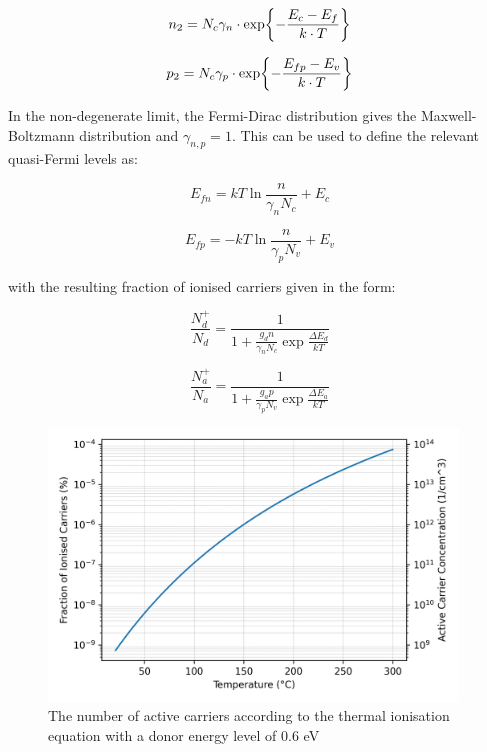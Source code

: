 \begin{refsection}
\begin{equation}
    n_{2}=N_{c}\gamma_{n}\cdot\exp{-\frac{E_{c}-E_{f}}{k\cdot T}}
    \label{eq:n_{2}_fermi_distribution}
\end{equation}

\begin{equation}
    p_{2}=N_{c}\gamma_{p}\cdot\exp{-\frac{E_{fp}-E_{v}}{k\cdot T}}
    \label{eq:p_{2}__fermi_distribution}
\end{equation}

In the non-degenerate limit, the Fermi-Dirac distribution gives the Maxwell-Boltzmann distribution and $\gamma_{n,p}=1$. This can be used to define the relevant quasi-Fermi levels as:

\begin{equation}
    E_{fn} = kT\ln{\frac{n}{\gamma_{n}N_{c}}}+E_{c}
    \label{eq:quasi-fermi_levels_carriers_n}
\end{equation}

\begin{equation}
    E_{fp} = -kT\ln{\frac{n}{\gamma_{p}N_{v}}}+E_{v}
    \label{eq:quasi-fermi_levels_carriers_p}
\end{equation}

with the resulting fraction of ionised carriers given in the form:

\begin{equation}
    \frac{N_{d}^{+}}{N_{d}} = \frac{1}{1+\frac{g_{d}n}{\gamma_{n}N_{c}}\exp{\frac{\Delta E_{d}}{kT}}}
    \label{eq:incomplete_ionisation_final_n}
\end{equation}

\begin{equation}
    \frac{N_{a}^{+}}{N_{a}} = \frac{1}{1+\frac{g_{a}p}{\gamma_{p}N_{v}}\exp{\frac{\Delta E_{a}}{kT}}}
    \label{eq:incomplete_ionisation_final_p}
\end{equation}

\begin{figure}[h]
    \centering
    \includegraphics[width=0.97\textwidth]{active_carriers.png}
    \caption{The number of active carriers according to the thermal ionisation equation with a donor energy level of 0.6 \si{\electronvolt}}
    \label{fig:active_carriers}
\end{figure}


\end{refsection}
